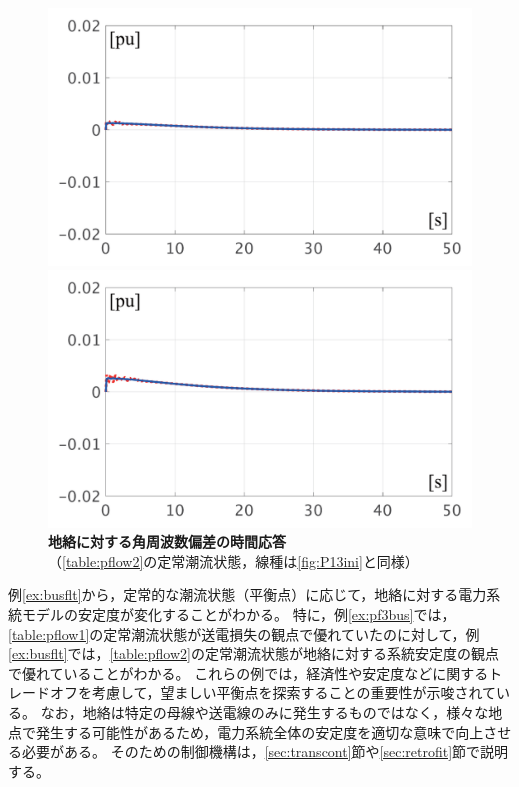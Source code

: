 \documentclass[tombow,dvipdfmx]{corona-a5-1.1}
\begin{document}
\begin{figure}[t]
  \centering
  {
  \begin{minipage}{0.49\linewidth}
    \centering
    \includegraphics[width = 1.0\linewidth]{figs/50mP3}
  \end{minipage}
  \begin{minipage}{0.49\linewidth}
    \centering
    \includegraphics[width = 1.0\linewidth]{figs/100mP3}
  \end{minipage}
  \medskip
  \caption{\textbf{地絡に対する角周波数偏差の時間応答}
  \\ \centering （\ref{table:pflow2}の定常潮流状態，線種は\ref{fig:P13ini}と同様）}
  \label{fig:P3fault}
  }
\medskip
\end{figure}

例\ref{ex:busflt}から，定常的な潮流状態（平衡点）に応じて，地絡に対する電力系統モデルの安定度が変化することがわかる。
特に，例\ref{ex:pf3bus}では，\ref{table:pflow1}の定常潮流状態が送電損失の観点で優れていたのに対して，例\ref{ex:busflt}では，\ref{table:pflow2}の定常潮流状態が地絡に対する系統安定度の観点で優れていることがわかる。
これらの例では，経済性や安定度などに関するトレードオフを考慮して，望ましい平衡点を探索することの重要性が示唆されている。
なお，地絡は特定の母線や送電線のみに発生するものではなく，様々な地点で発生する可能性があるため，電力系統全体の安定度を適切な意味で向上させる必要がある。
そのための制御機構は，\ref{sec:transcont}節や\ref{sec:retrofit}節で説明する。
\end{document}
